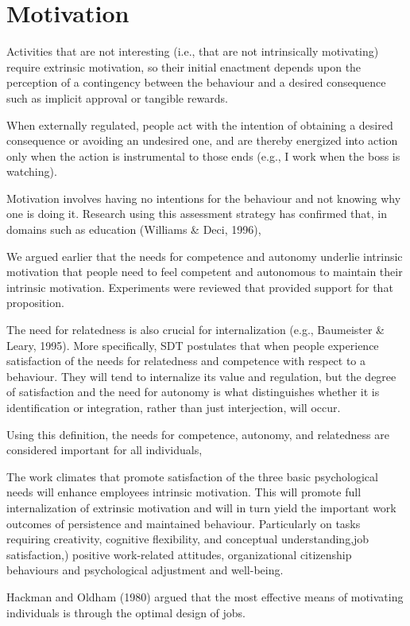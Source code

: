 \section{Motivation}
Activities that are not interesting (i.e., that are not intrinsically motivating) require extrinsic motivation, so their initial enactment depends upon the perception of a contingency between the behaviour and a desired consequence such as implicit approval or tangible rewards.

When externally regulated, people act with the intention of obtaining a desired consequence or avoiding an undesired one, and are thereby energized into action only when the action is instrumental to those ends (e.g., I work when the boss is watching).

Motivation involves having no intentions for the behaviour and not knowing why one is doing it. Research using this assessment strategy has confirmed that, in domains such as education (Williams \& Deci, 1996),

We argued earlier that the needs for competence and autonomy underlie intrinsic motivation that people need to feel competent and autonomous to maintain their intrinsic motivation. Experiments were reviewed that provided support for that proposition.

The need for relatedness is also crucial for internalization (e.g., Baumeister \& Leary, 1995). More speciﬁcally, SDT postulates that when people experience satisfaction of the needs for relatedness and competence with respect to a behaviour. They will tend to internalize its value and regulation, but the degree of satisfaction and the need for autonomy is what distinguishes whether it is identification or integration, rather than just interjection, will occur.

Using this definition, the needs for competence, autonomy, and relatedness are considered important for all individuals,

The work climates that promote satisfaction of the three basic psychological needs will enhance employees intrinsic motivation. This will promote full internalization of extrinsic motivation and will in turn yield the important work outcomes of persistence and maintained behaviour.
Particularly on tasks requiring creativity, cognitive flexibility, and conceptual understanding,job satisfaction,) positive work-related attitudes, organizational citizenship behaviours and psychological adjustment and well-being.


Hackman and Oldham (1980) argued that the most effective means of motivating individuals is through the optimal design of jobs.

